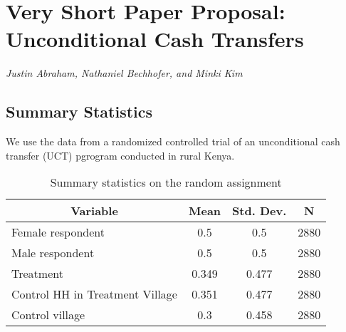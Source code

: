 \documentclass[11pt]{article}
\begin{document}
\section*{Very Short Paper Proposal: Unconditional Cash Transfers}

\noindent \textit{Justin Abraham, Nathaniel Bechhofer, and Minki Kim} \\

\subsection*{Summary Statistics}
We use the data from a randomized controlled trial of an unconditional cash transfer (UCT) pgrogram conducted in rural Kenya. 

 \begin{table}[htbp]\centering \caption{Summary statistics on the random assignment \label{sumstat}}
	\begin{tabular}{l c c  c}\hline\hline
		\multicolumn{1}{c}{\textbf{Variable}} & \textbf{Mean}
		& \textbf{Std. Dev.} & \textbf{N}\\ \hline
		Female respondent & 0.5 & 0.5  & 2880\\
		Male respondent & 0.5 & 0.5  & 2880\\
		Treatment & 0.349 & 0.477  & 2880\\
		Control HH in Treatment Village & 0.351 & 0.477  & 2880\\
		Control village & 0.3 & 0.458  & 2880\\
			\hline
	\end{tabular}
\end{table}
\end{document}
